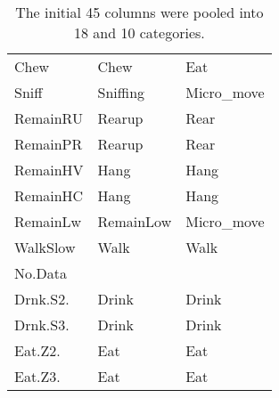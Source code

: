 \begin{table}[!htbp]
\begin{tabular}{|l|l|l|}
  Chew & Chew & Eat \\ 
  Sniff & Sniffing & Micro\_move \\ 
  RemainRU & Rearup & Rear \\ 
  RemainPR & Rearup & Rear \\ 
  RemainHV & Hang & Hang \\ 
  RemainHC & Hang & Hang \\ 
  RemainLw & RemainLow & Micro\_move \\ 
  WalkSlow & Walk & Walk \\ 
  No.Data &  &  \\ 
  Drnk.S2. & Drink & Drink \\ 
  Drnk.S3. & Drink & Drink \\ 
  Eat.Z2. & Eat & Eat \\ 
  Eat.Z3. & Eat & Eat \\ 
   \hline
\end{tabular}
\caption{The initial 45 columns were pooled into 18 and 10 categories.} 
\label{cat_table}
\end{table}
